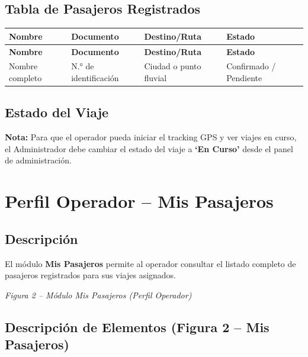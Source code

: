 \documentclass[12pt,a4paper]{article}
\begin{document}
\subsection{Tabla de Pasajeros Registrados}

\begin{longtable}{LLLL}
  \toprule
  \textbf{Nombre} & \textbf{Documento} & \textbf{Destino/Ruta} & \textbf{Estado} \\
  \midrule
  \endfirsthead
  \toprule
  \textbf{Nombre} & \textbf{Documento} & \textbf{Destino/Ruta} & \textbf{Estado} \\
  \midrule
  \endhead
  \bottomrule
  \endfoot
  Nombre completo & N.° de identificación & Ciudad o punto fluvial & Confirmado / Pendiente \\
\end{longtable}

\subsection{Estado del Viaje}

\begin{notabox}
\textbf{Nota:} Para que el operador pueda iniciar el tracking GPS y ver viajes en curso, el Administrador debe cambiar el estado del viaje a \textbf{`En Curso'} desde el panel de administración.
\end{notabox}

\section{Perfil Operador -- Mis Pasajeros}

\subsection{Descripción}

El módulo \textbf{Mis Pasajeros} permite al operador consultar el listado completo de pasajeros registrados para sus viajes asignados.

\textit{Figura 2 -- Módulo Mis Pasajeros (Perfil Operador)}

\subsection{Descripción de Elementos (Figura 2 -- Mis Pasajeros)}
\end{document}
